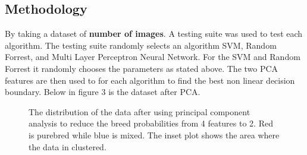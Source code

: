 \documentclass[12pt]{article}
\begin{document}
\subsection{Methodology}


By taking a dataset of \textbf{number of images}. A testing suite was used to test each algorithm.  The testing suite randomly selects an algorithm SVM, Random Forrest, and Multi Layer Perceptron Neural Network.  For the SVM and Random Forrest it randomly chooses the parameters as stated above.  The two PCA features are then used to for each algorithm to find the best non linear decision boundary. Below in figure 3 is the dataset after PCA.

\begin{figure}[H]
\caption{The distribution of the data after using principal component analysis to reduce the breed probabilities from 4 features to 2.   Red is purebred while blue is mixed.  The inset plot shows the area where the data in clustered.}
\end{figure}
\end{document}
